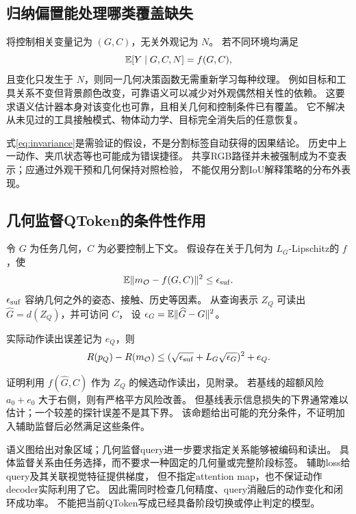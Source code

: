 \subsection{归纳偏置能处理哪类覆盖缺失}
将控制相关变量记为 $(G,C)$，无关外观记为 $N$。
若不同环境均满足
\begin{equation}
 \mathbb E[Y\mid G,C,N]=f(G,C),
 \label{eq:invariance}
\end{equation}
且变化只发生于 $N$，则同一几何决策函数无需重新学习每种纹理。
例如目标和工具关系不变但背景颜色改变，可靠语义可以减少对外观偶然相关性的依赖。
这要求语义估计器本身对该变化也可靠，且相关几何和控制条件已有覆盖。
它不解决从未见过的工具接触模式、物体动力学、目标完全消失后的任意恢复。

式\eqref{eq:invariance}是需验证的假设，不是分割标签自动获得的因果结论。
历史中上一动作、夹爪状态等也可能成为错误捷径\cite{dehaan2019}。
共享RGB路径并未被强制成为不变表示；应通过外观干预和几何保持对照检验，
不能仅用分割IoU解释策略的分布外表现。

\subsection{几何监督QToken的条件性作用}
令 $G$ 为任务几何，$C$ 为必要控制上下文。
假设存在关于几何为 $L_G$-Lipschitz的 $f$，使
\begin{equation}
 \mathbb E\lVert m_{\mathcal O}-f(G,C)\rVert^2\le\epsilon_{\rm suf}.
\end{equation}
$\epsilon_{\rm suf}$ 容纳几何之外的姿态、接触、历史等因素。
从查询表示 $Z_Q$ 可读出 $\widehat G=d(Z_Q)$，并可访问 $C$，
设 $\epsilon_G=\mathbb E\lVert\widehat G-G\rVert^2$。
\begin{proposition}[几何表示的误差界]
实际动作读出误差记为 $e_Q$，则
\begin{equation}
 R(p_Q)-R(m_{\mathcal O})
 \le(\sqrt{\epsilon_{\rm suf}}+L_G\sqrt{\epsilon_G})^2+e_Q.
 \label{eq:geometry}
\end{equation}
\end{proposition}
证明利用 $f(\widehat G,C)$ 作为 $Z_Q$ 的候选动作读出，见附录。
若基线的超额风险 $a_0+e_0$ 大于右侧，则有严格平方风险改善。
但基线表示信息损失的下界通常难以估计；一个较差的探针误差不是其下界。
该命题给出可能的充分条件，不证明加入辅助监督后必然满足这些条件。

语义图给出对象区域；几何监督query进一步要求指定关系能够被编码和读出。
具体监督关系由任务选择，而不要求一种固定的几何量或完整阶段标签。
辅助loss给query及其关联视觉特征提供梯度，
但不指定attention map，也不保证动作decoder实际利用了它。
因此需同时检查几何精度、query消融后的动作变化和闭环成功率。
不能把当前QToken写成已经具备阶段切换或停止判定的模型。

